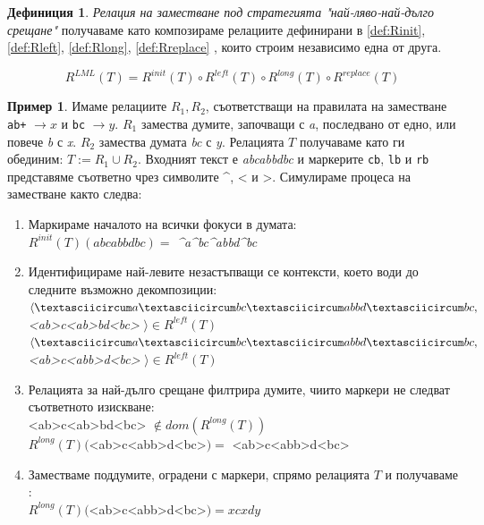 \documentclass[12pt, oneside]{article}
\theoremstyle{definition}
\newtheorem{definition}{Дефиниция}[section]
\newtheorem{example}{Пример}[section]
\begin{document}
\begin{definition} \emph{Релация на заместване под стратегията "най-ляво-най-дълго срещане"} получаваме като композираме релациите дефинирани в \ref{def:Rinit}, \ref{def:Rleft}, \ref{def:Rlong}, \ref{def:Rreplace} , които строим независимо една от друга.

\[ R^{LML}(T) = R^{init}(T) \circ R^{left}(T) \circ R^{long}(T) \circ R^{replace}(T) \]
\end{definition}

\begin{example}
	Имаме релациите \( R_1, R_2 \), съответстващи на правилата на заместване \verb/ab+/ \( \to x \) и \verb/bc/ \( \to y \). \(R_1\) замества думите, започващи с \emph{a}, последвано от едно, или повече \emph{b} с \emph{x}. \(R_2\) замества думата \emph{bc} с \emph{y}. Релацията \(T\) получаваме като ги обединим: \( T := R_1 \cup R_2 \). Входният текст е \emph{abcabbdbc} и маркерите \verb/cb/, \verb/lb/ и \verb/rb/ представяме съответно чрез символите \textasciicircum, < и >. Симулираме процеса на заместване както следва:
	\begin{enumerate}
		\item Маркираме началото на всички фокуси в думата: \\ \( R^{init}(T)(abcabbdbc) = \) \emph{\textasciicircum a\textasciicircum bc\textasciicircum abbd\textasciicircum bc}
		\item Идентифицираме най-левите незастъпващи се контексти, което води до следните възможно декомпозиции: \\ 
		\( \langle \textasciicircum a\textasciicircum bc\textasciicircum abbd\textasciicircum bc,\) \emph{<ab>c<ab>bd<bc>} \(\rangle \in R^{left}(T) \) \\
		\( \langle \textasciicircum a\textasciicircum bc\textasciicircum abbd\textasciicircum bc,\) \emph{<ab>c<abb>d<bc>} \(\rangle \in R^{left}(T) \)
		\item Релацията за най-дълго срещане филтрира думите, чиито маркери не следват съответното изискване: \\
		<ab>c<ab>bd<bc> \( \notin dom(R^{long}(T)) \) \\
		\( R^{long}(T)(\)<ab>c<abb>d<bc>\() = \) <ab>c<abb>d<bc>
		\item Заместваме поддумите, оградени с маркери, спрямо релацията \(T\) и получаваме : \\
		\( R^{long}(T)(\)<ab>c<abb>d<bc>\() = xcxdy \)
	\end{enumerate}
\end{example}
\end{document}
